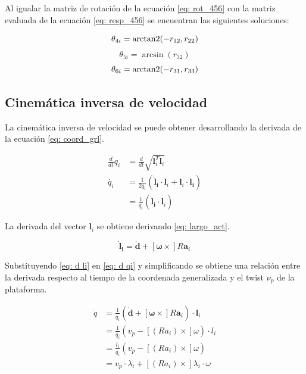 Al igualar la matriz de rotación de la 
ecuación \eqref{eq: rot_456} con la matriz 
evaluada de la ecuación \eqref{eq: resp_456} 
se encuentran las siguientes soluciones:

\begin{equation}
\theta_{4i} = \operatorname{arctan2} (-r_{12},r_{22})
\end{equation}
\begin{equation}
\theta_{5i} = \arcsin (r_{32})
\end{equation}
\begin{equation}
\theta_{6i} = \operatorname{arctan2} (-r_{31},r_{33})
\end{equation}

\subsection{Cinemática inversa de velocidad}
La cinemática inversa de velocidad se puede 
obtener desarrollando la derivada de 
la ecuación \eqref{eq: coord_grl}.

\begin{equation} \label{eq: d qi}
\begin{split}
\frac{d}{dt}q_i & = \frac{d}{dt}\sqrt{\mathbf l_i^T  \mathbf l_i}  \\
\dot{q_i} & = \frac{1}{2q_i} (\mathbf{\dot l_i} \cdot \mathbf l_i + \mathbf l_i \cdot \mathbf{\dot l_i})\\
 &= \frac{1}{q_i} (\mathbf{\dot l_i} \cdot \mathbf l_i)
\end{split}
\end{equation}

La derivada del vector $\mathbf l_i$ se obtiene derivando
\eqref{eq: largo_act}.

\begin{equation}\label{eq: d li}
 \mathbf{\dot l_i} = \mathbf{\dot d} + [\boldsymbol \omega \times] R\mathbf a_i
\end{equation}

Substituyendo \eqref{eq: d li} en \ref{eq: d qi} y 
simplificando se obtiene una relación entre
la derivada respecto al tiempo de la coordenada generalizada 
y el twist  $\nu_p$ de la plataforma.

\begin{equation}
 \begin{split}
    \dot q  & =\frac{1}{q_i}(\mathbf{\dot{d}} + [\boldsymbol \omega \times] R \mathbf a_i)\cdot \mathbf l_i   \\
            & = \frac{1}{q_i}(v_p - [(Ra_i)\times]\omega)\cdot l_i\\
            & = \frac{l_i}{q_i}\left( v_p - [(Ra_i)\times]\omega \right) \\
            & = v_p \cdot \lambda_i + [(Ra_i)\times]\lambda_i \cdot \omega
 \end{split}
\end{equation}

